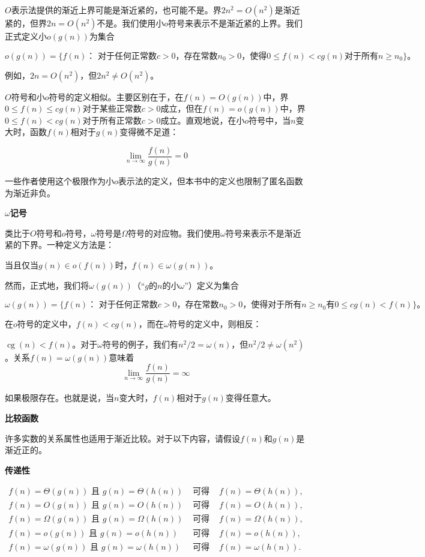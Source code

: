 \documentclass[lang=cn,newtx,10pt,scheme=chinese]{elegantbook}
\begin{document}
$O$表示法提供的渐近上界可能是渐近紧的，也可能不是。界$2 n^2=O(n^2)$是渐近紧的，但界$2 n=O(n^2)$不是。我们使用小$o$符号来表示不是渐近紧的上界。我们正式定义小$o(g(n))$为集合

$$
o(g(n))=\{f(n)：\text { 对于任何正常数} c>0，\text{存在常数} n_0>0 \text {，使得} 0 \leq f(n)<c g(n) \text {对于所有} n \geq n_0\}。
$$

例如，$2 n=O(n^2)$，但$2 n^2 \neq O(n^2)$。

$O$符号和小$o$符号的定义相似。主要区别在于，在$f(n)=O(g(n))$中，界$0 \leq f(n) \leq c g(n)$对于某些正常数$c>0$成立，但在$f(n)=o(g(n))$中，界$0 \leq f(n)<c g(n)$对于所有正常数$c>0$成立。直观地说，在小$o$符号中，当$n$变大时，函数$f(n)$相对于$g(n)$变得微不足道：

$$
\lim _{n \rightarrow \infty} \frac{f(n)}{g(n)}=0
$$

一些作者使用这个极限作为小$o$表示法的定义，但本书中的定义也限制了匿名函数为渐近非负。

\textbf{$\omega$记号}

类比于$O$符号和$o$符号，$\omega$符号是$\Omega$符号的对应物。我们使用$\omega$符号来表示不是渐近紧的下界。一种定义方法是：

当且仅当$g(n) \in o(f(n))$时，$f(n) \in \omega(g(n))$。

然而，正式地，我们将$\omega(g(n))$（``$g$的$n$的小$\omega$''）定义为集合

$$
\omega(g(n))=\{f(n)：\text { 对于任何正常数} c>0，\text{存在常数} n_0>0 \text {，使得}\text {对于所有} n \geq n_0 \text{有} 0 \leq c g(n)<f(n) \}。
$$

在$o$符号的定义中，$f(n)<c g(n)$，而在$\omega$符号的定义中，则相反：

$\operatorname{cg}(n)<f(n)$。对于$\omega$符号的例子，我们有$n^2 / 2=\omega(n)$，但$n^2 / 2 \neq \omega(n^2)$。关系$f(n)=\omega(g(n))$意味着
$$
\lim _{n \rightarrow \infty} \frac{f(n)}{g(n)}=\infty
$$

如果极限存在。也就是说，当$n$变大时，$f(n)$相对于$g(n)$变得任意大。

\textbf{比较函数}

许多实数的关系属性也适用于渐近比较。对于以下内容，请假设$f(n)$和$g(n)$是渐近正的。

\textbf{传递性}

\begin{equation*}
\begin{array}{llll}
f(n)=\Theta(g(n)) \text { 且 } g(n)=\Theta(h(n)) & \text { 可得 } & f(n)=\Theta(h(n)), \\
f(n)=O(g(n)) \text { 且 } g(n)=O(h(n)) & \text { 可得 } & f(n)=O(h(n)), \\
f(n)=\Omega(g(n)) \text { 且 } g(n)=\Omega(h(n)) & \text { 可得 } & f(n)=\Omega(h(n)), \\
f(n)=o(g(n)) \text { 且 } g(n)=o(h(n)) & \text { 可得 } & f(n)=o(h(n)), \\
f(n)=\omega(g(n)) \text { 且 } g(n)=\omega(h(n)) & \text { 可得 } & f(n)=\omega(h(n)) .
\end{array}
\end{equation*}
\end{document}
